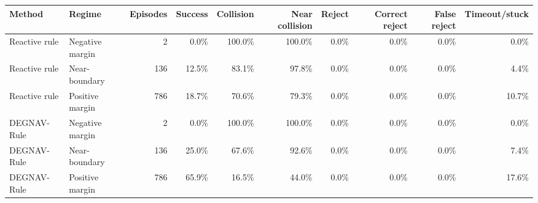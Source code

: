 \begin{tabular}{llrrrrrrrr}
\toprule
Method & Regime & Episodes & Success & Collision & Near collision & Reject & Correct reject & False reject & Timeout/stuck \\
\midrule
Reactive rule & Negative margin & 2 & 0.0\% & 100.0\% & 100.0\% & 0.0\% & 0.0\% & 0.0\% & 0.0\% \\
Reactive rule & Near-boundary & 136 & 12.5\% & 83.1\% & 97.8\% & 0.0\% & 0.0\% & 0.0\% & 4.4\% \\
Reactive rule & Positive margin & 786 & 18.7\% & 70.6\% & 79.3\% & 0.0\% & 0.0\% & 0.0\% & 10.7\% \\
DEGNAV-Rule & Negative margin & 2 & 0.0\% & 100.0\% & 100.0\% & 0.0\% & 0.0\% & 0.0\% & 0.0\% \\
DEGNAV-Rule & Near-boundary & 136 & 25.0\% & 67.6\% & 92.6\% & 0.0\% & 0.0\% & 0.0\% & 7.4\% \\
DEGNAV-Rule & Positive margin & 786 & 65.9\% & 16.5\% & 44.0\% & 0.0\% & 0.0\% & 0.0\% & 17.6\% \\
\bottomrule
\end{tabular}
